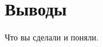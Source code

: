 \documentclass[a4paper,12pt]{report}
\begin{document}
%
%
%
%
%
%
%
%
%
%
%
%

\chapter*{Выводы}

Что вы сделали и поняли.
\end{document}
